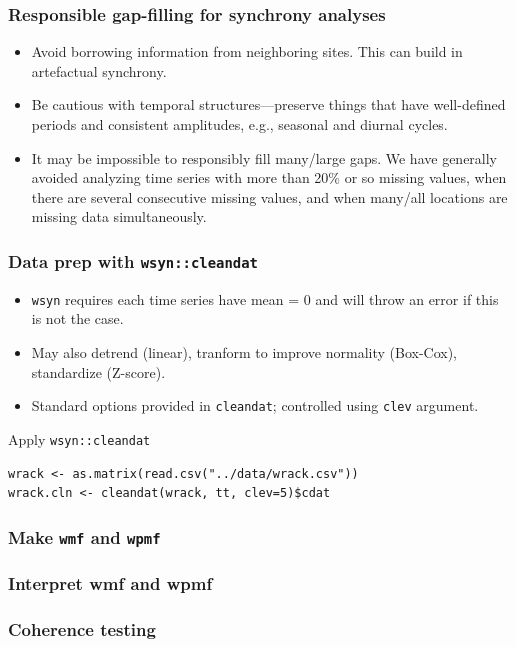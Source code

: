 \documentclass{beamer}
\begin{document}
\begin{frame}
\frametitle{Responsible gap-filling for synchrony analyses}
\begin{itemize}
\item Avoid borrowing information from neighboring sites. This can build in artefactual synchrony.
\item Be cautious with temporal structures---preserve things that have well-defined periods and consistent amplitudes, e.g., seasonal and diurnal cycles.
\item It may be impossible to responsibly fill many/large gaps. We have generally avoided analyzing time series with more than 20\% or so missing values, when there are several consecutive missing values, and when many/all locations are missing data simultaneously.
\end{itemize}
\end{frame}

\begin{frame}[fragile]
\frametitle{Data prep with \texttt{wsyn::cleandat}}
\begin{itemize}
\item \texttt{wsyn} requires each time series have mean = 0 and will throw an error if this is not the case.
\item May also detrend (linear), tranform to improve normality (Box-Cox), standardize (Z-score). 
\item Standard options provided in \texttt{cleandat}; controlled using \texttt{clev} argument.
\end{itemize}
\begin{exampleblock}{Apply \texttt{wsyn::cleandat}}
\begin{verbatim}
wrack <- as.matrix(read.csv("../data/wrack.csv"))
wrack.cln <- cleandat(wrack, tt, clev=5)$cdat 
\end{verbatim}
\end{exampleblock}
\end{frame}

\begin{frame}[fragile]
\frametitle{Make \texttt{wmf} and \texttt{wpmf}}
\end{frame}

\begin{frame}
\frametitle{Interpret wmf and wpmf}
\end{frame}

\begin{frame}
\frametitle{Coherence testing}

\end{frame}


\begin{frame}

\end{frame}
\end{document}
